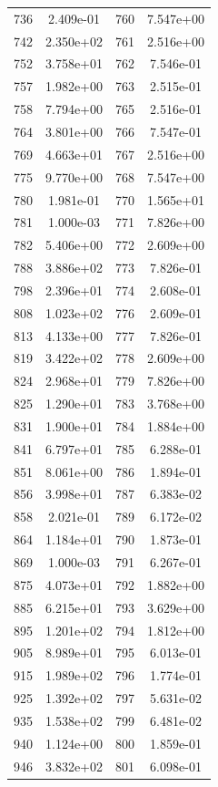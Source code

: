 \documentclass[12pt]{article}
\begin{document}
\begin{longtable}{@{}cccc@{}}
736 & 2.409e-01 & 760 & 7.547e+00 \\
742 & 2.350e+02 & 761 & 2.516e+00 \\
752 & 3.758e+01 & 762 & 7.546e-01 \\
757 & 1.982e+00 & 763 & 2.515e-01 \\
758 & 7.794e+00 & 765 & 2.516e-01 \\
764 & 3.801e+00 & 766 & 7.547e-01 \\
769 & 4.663e+01 & 767 & 2.516e+00 \\
775 & 9.770e+00 & 768 & 7.547e+00 \\
780 & 1.981e-01 & 770 & 1.565e+01 \\
781 & 1.000e-03 & 771 & 7.826e+00 \\
782 & 5.406e+00 & 772 & 2.609e+00 \\
788 & 3.886e+02 & 773 & 7.826e-01 \\
798 & 2.396e+01 & 774 & 2.608e-01 \\
808 & 1.023e+02 & 776 & 2.609e-01 \\
813 & 4.133e+00 & 777 & 7.826e-01 \\
819 & 3.422e+02 & 778 & 2.609e+00 \\
824 & 2.968e+01 & 779 & 7.826e+00 \\
825 & 1.290e+01 & 783 & 3.768e+00 \\
831 & 1.900e+01 & 784 & 1.884e+00 \\
841 & 6.797e+01 & 785 & 6.288e-01 \\
851 & 8.061e+00 & 786 & 1.894e-01 \\
856 & 3.998e+01 & 787 & 6.383e-02 \\
858 & 2.021e-01 & 789 & 6.172e-02 \\
864 & 1.184e+01 & 790 & 1.873e-01 \\
869 & 1.000e-03 & 791 & 6.267e-01 \\
875 & 4.073e+01 & 792 & 1.882e+00 \\
885 & 6.215e+01 & 793 & 3.629e+00 \\
895 & 1.201e+02 & 794 & 1.812e+00 \\
905 & 8.989e+01 & 795 & 6.013e-01 \\
915 & 1.989e+02 & 796 & 1.774e-01 \\
925 & 1.392e+02 & 797 & 5.631e-02 \\
935 & 1.538e+02 & 799 & 6.481e-02 \\
940 & 1.124e+00 & 800 & 1.859e-01 \\
946 & 3.832e+02 & 801 & 6.098e-01 \\

\end{longtable}
\end{document}
